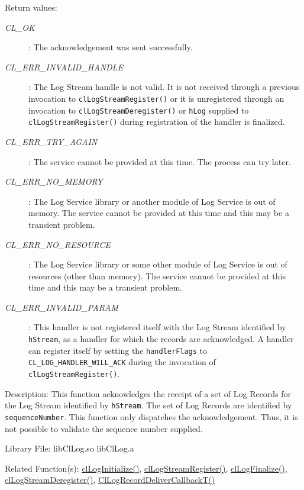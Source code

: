 \begin{flushleft}
\begin{Desc}
\item[Return values:]
\begin{description}
\item[{\em CL\_\-OK}]: The acknowledgement was sent successfully.
\item[{\em CL\_\-ERR\_\-INVALID\_\-HANDLE}]: The Log Stream handle is not valid. It is not received through a previous invocation to
{\tt{clLogStreamRegister()}} or it is unregistered through an invocation to {\tt{clLogStreamDeregister()}} or {\tt{hLog}} supplied to 
{\tt{clLogStreamRegister()}} during registration of the handler is finalized.
\item[{\em CL\_\-ERR\_\-TRY\_\-AGAIN}]: The service cannot be provided at this time. The process can try later.
\item[{\em CL\_\-ERR\_\-NO\_\-MEMORY}]: The Log Service library or another module of Log Service is out of memory. The service cannot 
be provided at this time and this may be a transient problem.
\item[{\em CL\_\-ERR\_\-NO\_\-RESOURCE}]: The Log Service library or some other module of Log Service is out of resources 
(other than memory). The service cannot be provided at this time and this may be a transient problem.
\item[{\em CL\_\-ERR\_\-INVALID\_\-PARAM}]: This handler is not registered itself with the Log Stream identified by {\tt{hStream}}, as a
handler for which the records are acknowledged. A handler can register itself by setting the 
{\tt{handlerFlags}} to {\tt{CL\_\-LOG\_\-HANDLER\_\-WILL\_\-ACK}} during the invocation of {\tt{clLogStreamRegister()}}.
\end{description}
\end{Desc}



\begin{Desc}
\item[Description:] This function acknowledges the receipt of a set of Log Records for the Log Stream identified by {\tt{hStream}}. The set of Log 
Records are identified by {\tt{sequenceNumber}}. This function only dispatches the acknowledgement. Thus, it is not possible to validate the sequence
number supplied.
\end{Desc}
\begin{Desc}
\item[Library File:] libClLog.so
\newline
libClLog.a
\end{Desc}
\begin{Desc}
\item[Related Function(s):]\hyperlink{pagelog101}{clLogInitialize()}, \hyperlink{pagelog112}{clLogStreamRegister()},
\hyperlink{pagelog102}{clLogFinalize()}, \hyperlink{pagelog115}{clLogStreamDeregister()}, \hyperlink{pagelog113}{ClLogRecordDeliverCallbackT()}
\end{Desc}
\newpage



\end{flushleft}
